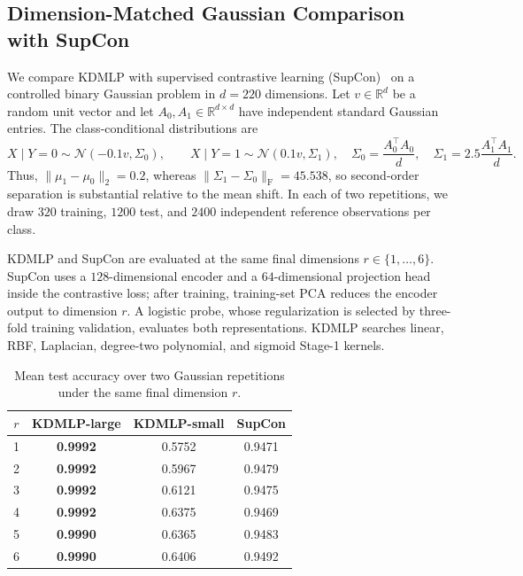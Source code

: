 \subsection{Dimension-Matched Gaussian Comparison with SupCon}
\label{subsec:gaussian-supcon}

We compare KDMLP with supervised contrastive learning (SupCon)~\cite{khosla2020supervised}
on a controlled binary Gaussian problem in $d=220$ dimensions.  Let $v\in\mathbb{R}^d$
be a random unit vector and let $A_0,A_1\in\mathbb{R}^{d\times d}$ have independent
standard Gaussian entries.  The class-conditional distributions are
\begin{equation}
 X\mid Y=0\sim\mathcal{N}(-0.1v,\Sigma_0),\qquad
 X\mid Y=1\sim\mathcal{N}(0.1v,\Sigma_1),
 \quad
 \Sigma_0=\frac{A_0^{\top}A_0}{d},\quad
 \Sigma_1=2.5\frac{A_1^{\top}A_1}{d}.
\end{equation}
Thus, $\|\mu_1-\mu_0\|_2=0.2$, whereas
$\|\Sigma_1-\Sigma_0\|_{\mathrm F}=45.538$, so second-order separation is
substantial relative to the mean shift.  In each of two repetitions, we draw
$320$ training, $1200$ test, and $2400$ independent reference observations per
class.

KDMLP and SupCon are evaluated at the same final dimensions $r\in\{1,\ldots,6\}$.
SupCon uses a $128$-dimensional encoder and a $64$-dimensional projection head
inside the contrastive loss; after training, training-set PCA reduces the encoder
output to dimension $r$.  A logistic probe, whose regularization is selected by
three-fold training validation, evaluates both representations.  KDMLP searches
linear, RBF, Laplacian, degree-two polynomial, and sigmoid Stage-1 kernels.

\begin{table}[t]
\centering
\caption{Mean test accuracy over two Gaussian repetitions under the same final
dimension $r$.}
\label{tab:gaussian-supcon-same-r}
\small
\begin{tabular}{c c c c}
\toprule
$r$ & KDMLP-large & KDMLP-small & SupCon \\
\midrule
1 & \textbf{0.9992} & 0.5752 & 0.9471 \\
2 & \textbf{0.9992} & 0.5967 & 0.9479 \\
3 & \textbf{0.9992} & 0.6121 & 0.9475 \\
4 & \textbf{0.9992} & 0.6375 & 0.9469 \\
5 & \textbf{0.9990} & 0.6365 & 0.9483 \\
6 & \textbf{0.9990} & 0.6406 & 0.9492 \\
\bottomrule
\end{tabular}
\end{table}

